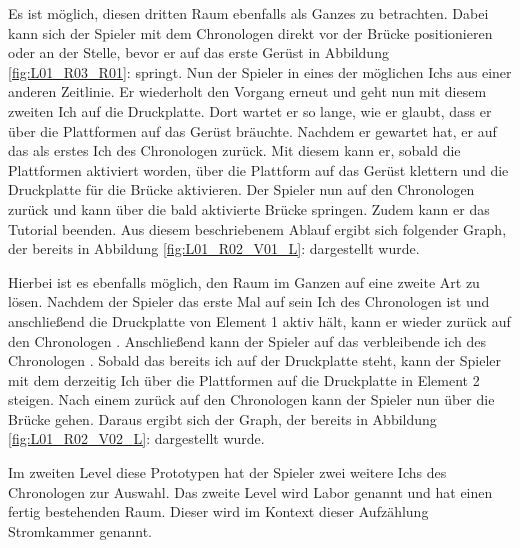 Es ist möglich, diesen dritten Raum ebenfalls als Ganzes zu betrachten. Dabei kann sich der Spieler mit dem Chronologen direkt vor der Brücke positionieren oder an der Stelle, bevor er auf das erste Gerüst in Abbildung \ref{fig:L01_R03_R01}:  springt. Nun  der Spieler in eines der möglichen Ichs aus einer anderen Zeitlinie. Er wiederholt den Vorgang erneut und geht nun mit diesem zweiten Ich auf die Druckplatte. Dort wartet er so lange, wie er glaubt, dass er über die Plattformen auf das Gerüst bräuchte. Nachdem er gewartet hat,  er auf das als erstes  Ich des Chronologen zurück. Mit diesem kann er, sobald die Plattformen aktiviert worden, über die Plattform auf das Gerüst klettern und die Druckplatte für die Brücke aktivieren. Der Spieler  nun auf den Chronologen zurück und kann über die bald aktivierte Brücke springen. Zudem kann er das Tutorial beenden.
Aus diesem beschriebenem Ablauf ergibt sich folgender Graph, der bereits in Abbildung \ref{fig:L01_R02_V01_L}:  dargestellt wurde.

Hierbei ist es ebenfalls möglich, den Raum im Ganzen auf eine zweite Art zu lösen. Nachdem der Spieler das erste Mal auf sein Ich des Chronologen  ist und anschließend die Druckplatte von Element 1 aktiv hält, kann er wieder zurück auf den Chronologen . Anschließend kann der Spieler auf das verbleibende ich des Chronologen . Sobald das bereits  ich auf der Druckplatte steht, kann der Spieler mit dem derzeitig  Ich über die Plattformen auf die Druckplatte in Element 2 steigen. Nach einem  zurück auf den Chronologen kann der Spieler nun über die Brücke gehen. Daraus ergibt sich der Graph, der bereits in Abbildung \ref{fig:L01_R02_V02_L}:  dargestellt wurde.

Im zweiten Level diese Prototypen hat der Spieler zwei weitere Ichs des Chronologen zur Auswahl. Das zweite Level wird Labor genannt und hat einen fertig bestehenden Raum. Dieser wird im Kontext dieser Aufzählung Stromkammer genannt.

